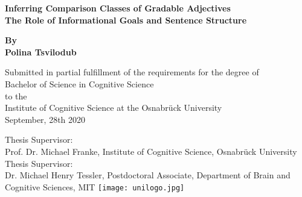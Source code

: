 \begin{titlepage}
	\begin{center}
		\vspace*{1cm}
		\Huge
		\textbf{Inferring Comparison Classes of Gradable Adjectives\\} 
		\vspace{0.5cm}
		\Large
		\textbf{The Role of Informational Goals and Sentence Structure}
		
		\vspace{1cm}
		
	
		\textbf{By \\ Polina Tsvilodub}
		
		\vspace{1cm}
		\small
		Submitted in partial fulfillment of the requirements for the degree of \\
		Bachelor of Science in Cognitive Science \\ to the \\
		Institute of Cognitive Science at the Osnabrück University\\
		September, 28th 2020
		
		\vspace{3cm}
		Thesis Supervisor:\\ Prof. Dr. Michael Franke, Institute of Cognitive Science, Osnabrück University \\
		\vspace{0.5cm}
		Thesis Supervisor:\\ Dr. Michael Henry Tessler, Postdoctoral Associate, Department of Brain and Cognitive Sciences, MIT  
		\vfill 
		\texttt{[image: unilogo.jpg]}
		
	\end{center}
\end{titlepage}